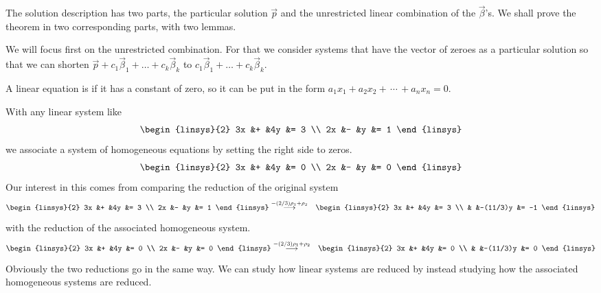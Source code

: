 The solution description has two parts, 
the particular solution $\vec{p}$ 
and the unrestricted linear combination of the $\vec{\beta}$'s.
We shall prove the theorem in two corresponding parts, with two lemmas.

We will focus first on the unrestricted combination.
For that we consider systems that have the vector of zeroes
as a particular solution
so that we can shorten $\vec{p}+c_1\vec{\beta}_1+\dots+c_k\vec{\beta}_k$
to $c_1\vec{\beta}_1+\dots+c_k\vec{\beta}_k$.

\begin{definition}
A linear equation is %
 if it has a constant of zero, so
it can be put in the form $a_1x_1+a_2x_2+\,\cdots\,+a_nx_n=0$.
\end{definition}

\begin{example}  \label{ex:FirstExHomoSys}
With any linear system like
\begin{equation*}
  \begin{linsys}{2}
    3x  &+  &4y  &=  3  \\
    2x  &-  &y   &=  1  
  \end{linsys}
\end{equation*}
we associate a system of homogeneous equations by setting the right side to
zeros.
\begin{equation*}
  \begin{linsys}{2}
    3x  &+  &4y  &=  0  \\
    2x  &-  &y   &=  0  
  \end{linsys}
\end{equation*}
Our interest in this comes from 
comparing the reduction of the original system
\begin{eqnarray*}
  \begin{linsys}{2}
    3x  &+  &4y  &=  3  \\
    2x  &-  &y   &=  1  
  \end{linsys}
  &\grstep{-(2/3)\rho_1+\rho_2}
  &\begin{linsys}{2}
    3x  &+  &4y        &=  3  \\
        &   &-(11/3)y   &=  -1  
   \end{linsys}
\end{eqnarray*}
with the reduction of the associated homogeneous system.
\begin{eqnarray*}
  \begin{linsys}{2}
    3x  &+  &4y  &=  0  \\
    2x  &-  &y   &=  0  
  \end{linsys}
  &\grstep{-(2/3)\rho_1+\rho_2}
  &\begin{linsys}{2}
    3x  &+  &4y        &=  0  \\
        &   &-(11/3)y   &=  0
   \end{linsys}
\end{eqnarray*}
Obviously the two reductions go in the same way.
We can study how linear systems are reduced by instead studying how
the associated homogeneous systems are reduced.
\end{example}

